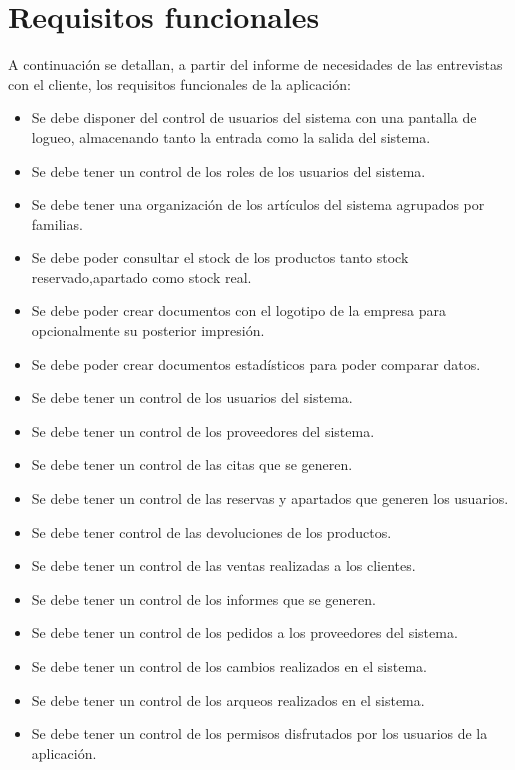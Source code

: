\section{Requisitos funcionales}
A continuación se detallan, a partir del informe de necesidades de las entrevistas con el cliente, los requisitos funcionales de la aplicación:
\\
\begin{itemize}\renewcommand{\labelitemi}{$\diamond$}

\item Se debe disponer del control de usuarios del sistema con una pantalla de logueo, almacenando tanto la entrada como la salida del sistema.
\item Se debe tener un control de los roles de los usuarios del sistema.
\item Se debe tener una organización de los artículos del sistema agrupados por familias.
\item Se debe poder consultar el stock de los productos tanto stock reservado,apartado como stock real.
\item Se debe poder crear documentos con el logotipo de la empresa para opcionalmente su posterior impresión. 
\item Se debe poder crear documentos estadísticos para poder comparar datos.
\item Se debe tener un control de los usuarios del sistema.
\item Se debe tener un control de los proveedores del sistema.
\item Se debe tener un control de las citas que se generen.
\item Se debe tener un control de las reservas y apartados que generen los usuarios.
\item Se debe tener control de las devoluciones de los productos.
\item Se debe tener un control de las ventas realizadas a los clientes.
\item Se debe tener un control de los informes que se generen.
\item Se debe tener un control de los pedidos a los proveedores del sistema.
\item Se debe tener un control de los cambios realizados en el sistema.
\item Se debe tener un control de los arqueos realizados en el sistema.
\item Se debe tener un control de los permisos disfrutados por los usuarios de la aplicación.

\end{itemize}

